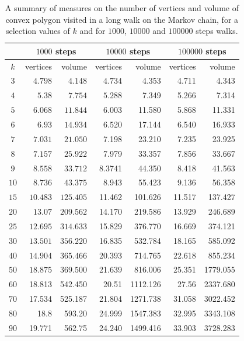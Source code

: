 \begin{table}[h]
  \begin{center}
  \begin{tabular}{c|r|r|r|r|r|r}
    & \multicolumn{2}{c|}{$1000$ steps} & \multicolumn{2}{c|}{$10000$ steps} & \multicolumn{2}{c}{$100000$ steps} \\
    \hline
    \hline
    $k$ & vertices & volume & vertices & volume & vertices & volume \\
    \hline
    $3$ & $4.798$ & $4.148$ & $4.734$ & 4.353 & 4.711 & 4.343\\
    $4$ & $5.38$ & $7.754$ & $5.288$ & 7.349 & 5.266 & 7.314\\
    $5$ & $6.068$ & $11.844$ & 6.003 & 11.580 & 5.868 & 11.331\\
    $6$ & $6.93$ & $14.934$ & 6.520 & 17.144 & 6.540 & 16.933\\
    $7$ & $7.031$ & $21.050$ & 7.198 & 23.210 & 7.235 & 23.925\\
    $8$ & $7.157$ & $25.922$ & 7.979 & 33.357 & 7.856 & 33.667\\
    $9$ & $8.558$ & $33.712$ & 8.3741 & 44.350 & 8.418 & 41.563\\
    $10$ & $8.736$ & $43.375$ & 8.943 & 55.423 & 9.136 & 56.358\\
    $15$ & $10.483$ & $125.405$ & 11.462 & 101.626 & 11.517 & 137.427\\
    $20$ & $13.07$ & $209.562$ & 14.170 & 219.586 & 13.929 & 246.689\\
    $25$ & $12.695$ & $314.633$ & 15.829 & 376.770 & 16.669 & 374.121\\
    $30$ & $13.501$ & $356.220$ & 16.835 & 532.784 & 18.165 & 585.092\\
    $40$ & $14.904$ & $365.466$ & 20.393 & 714.765 & 22.618 & 855.234\\
    $50$ & $18.875$ & $369.500$ & 21.639 & 816.006 & 25.351 & 1779.055\\
    $60$ & 18.813 & 542.450 & 20.51 & 1112.126 & 27.56 & 2337.680\\
    $70$ & 17.534 & 525.187 & 21.804 & 1271.738 & 31.058 & 3022.452\\
    $80$ & 18.8 & 593.20 & 24.999 & 1547.383 & 32.995 & 3343.108\\
    $90$ & 19.771 & 562.75 & 24.240 & 1499.416 & 33.903 & 3728.283\\
    \hline
  \end{tabular}
  \caption{A summary of measures on the number of vertices and volume of convex polygon visited in a long walk on the Markov chain, for a selection values of $k$ and for $1000$, $10000$ and $100000$ steps walks.}
  \label{Tab.Summary}
  \end{center}
\end{table}

